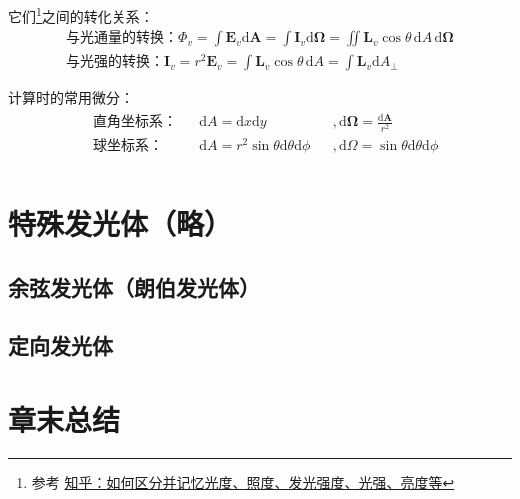 \documentclass[UTF8]{report}
\theoremstyle{MyLineTheoremStyle} %
\theoremstyle{MyBlockTheoremStyle} %
\theoremstyle{MySubsubsectionStyle} %
\begin{document}
它们\footnote{参考 \href{https://www.zhihu.com/question/53080536/answer/133398317}{知乎：如何区分并记忆光度、照度、发光强度、光强、亮度等}}之间的转化关系：
\begin{gather}
\text{与光通量的转换：} \Phi_v = \int \boldsymbol{E}_v \mathrm{d}\boldsymbol{A} = \int \boldsymbol{I}_v \mathrm{d}\boldsymbol{\Omega} = \iint \boldsymbol{L}_v \cos \theta\, \mathrm{d}A \,\mathrm{d} \boldsymbol{\Omega} \\ 
\text{与光强的转换：} \boldsymbol{I}_v = r^2\boldsymbol{E}_v = \int \boldsymbol{L}_v \cos \theta\, \mathrm{d}A = \int \boldsymbol{L}_v  \mathrm{d}A_{\perp}
\end{gather}

计算时的常用微分：
\begin{gather}
\begin{aligned}
    & \text{直角坐标系：}&& \mathrm{d}A = \mathrm{d}x \mathrm{d}y &&,  \mathrm{d}\boldsymbol{\Omega} = \frac{\mathrm{d}\boldsymbol{A}}{r^2} \\ 
    & \text{球坐标系：}&& \mathrm{d}A = r^2 \sin \theta \mathrm{d}\theta \mathrm{d}\phi &&,\mathrm{d}\Omega = \sin \theta \mathrm{d}\theta \mathrm{d}\phi \\ 
\end{aligned}
\end{gather}

\section{特殊发光体（略）}

\subsection{余弦发光体（朗伯发光体）}

\subsection{定向发光体}

\section{章末总结}
\end{document}
